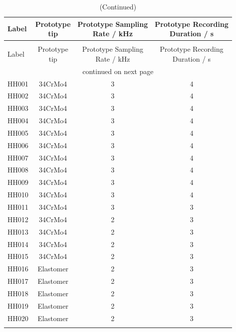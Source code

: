 {\scriptsize%
\begin{longtable}{lccc}
\caption[Hammer-Hammer Test Measurements]{Hammer-hammer test measurements}\\
\toprule
Label & \makecell{Prototype\\tip} & \makecell{Prototype Sampling\\Rate / \si{\kilo\hertz}} & \makecell{Prototype Recording\\Duration / \si{\second}}\\
\midrule
\endfirsthead
\caption[]{(Continued)}\\
\toprule
Label & \makecell{Prototype\\tip} & \makecell{Prototype Sampling\\Rate / \si{\kilo\hertz}} & \makecell{Prototype Recording\\Duration / \si{\second}}\\
\midrule
\endhead
\midrule
\multicolumn{4}{c}{continued on next page}\\
\bottomrule
\endfoot
\endlastfoot
\hline
	HH001 & 34CrMo4 & 3 & 4\\
	HH002 & 34CrMo4 & 3 & 4\\
	HH003 & 34CrMo4 & 3 & 4\\
	HH004 & 34CrMo4 & 3 & 4\\
	HH005 & 34CrMo4 & 3 & 4\\
	HH006 & 34CrMo4 & 3 & 4\\
	HH007 & 34CrMo4 & 3 & 4\\
	HH008 & 34CrMo4 & 3 & 4\\
	HH009 & 34CrMo4 & 3 & 4\\
	HH010 & 34CrMo4 & 3 & 4\\
	HH011 & 34CrMo4 & 3 & 3\\
	HH012 & 34CrMo4 & 2 & 3\\
	HH013 & 34CrMo4 & 2 & 3\\
	HH014 & 34CrMo4 & 2 & 3\\
	HH015 & 34CrMo4 & 2 & 3\\
	HH016 & Elastomer & 2 & 3\\
	HH017 & Elastomer & 2 & 3\\
	HH018 & Elastomer & 2 & 3\\
	HH019 & Elastomer & 2 & 3\\
	HH020 & Elastomer & 2 & 3\\
\bottomrule
\label{tab:hh_tests}
\end{longtable}
}

